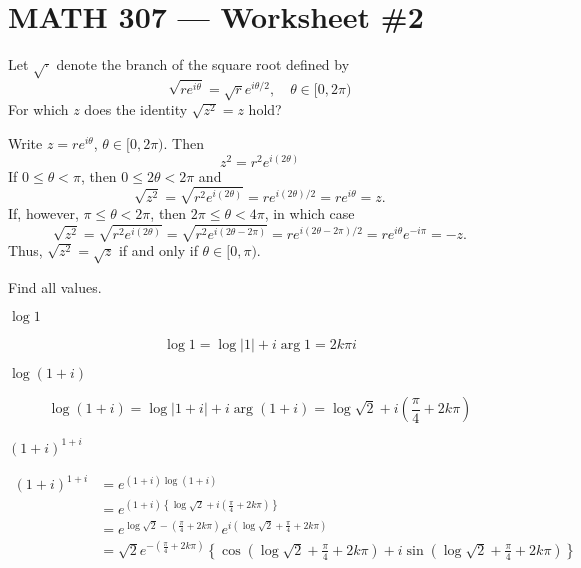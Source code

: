 \documentclass[12pt]{exam}
\begin{document}
\section*{MATH 307 --- Worksheet \#2 }

\begin{questions}
    \setlength\itemsep{1.25em}
    \setlength\parskip{1em}

    \question
    Let $\sqrt{\cdot}$ denote the branch of the square root defined by
    \[
        \sqrt {re^{i\theta}} = \sqrt re^{i\theta/2},\quad \theta\in [0,2\pi)
    \]
    For which $z$ does the identity $\sqrt{z^2}=z$ hold?

    \begin{solution}
        Write $z=re^{i\theta}$, $\theta\in[0,2\pi)$. Then
        \[
            z^2 = r^2e^{i(2\theta)}
        \]
        If $0\leq \theta < \pi$, then $0\leq 2\theta < 2\pi$ and
        \[
            \sqrt {z^2} = \sqrt{r^2e^{i(2\theta)}} = re^{i(2\theta)/2} = re^{i\theta}=z.
        \]
        If, however, $\pi\leq \theta < 2\pi$, then $2\pi\leq \theta < 4\pi$,
        in which case
        \[
            \sqrt {z^2} = \sqrt{r^2e^{i(2\theta)}} = \sqrt{r^2e^{i(2\theta-2\pi)}} =re^{i(2\theta-2\pi)/2} = re^{i\theta}e^{-i\pi}=-z.
        \]
        Thus, $\sqrt{z^2}=\sqrt z$ if and only if $\theta\in [0,\pi)$.
    
    \end{solution}
    \question
    Find all values.
    \begin{parts}
        \item $\log 1$
        \begin{solution}
            \[
                \log 1 = \log |1| + i\arg 1 = 2k\pi i
            \]
        \end{solution}

        \item $\log (1+i)$
        \begin{solution}
            \[
                \log (1+i) = \log |1+i| + i\arg(1+i) = \log\sqrt 2 + i\left(\frac\pi 4 + 2k\pi\right)
            \]
        \end{solution}

        \item $(1+i)^{1+i}$
        \begin{solution}
            \begin{align*}
                (1+i)^{1+i} &= e^{(1+i)\log(1+i)}\\
                &= e^{(1+i)\left\{\log\sqrt 2 + i\left(\frac\pi 4 + 2k\pi\right)\right\}}\\
                &= e^{\log\sqrt2-\left(\frac\pi4+2k\pi\right)}e^{i(\log\sqrt2 + \frac\pi4 + 2k\pi)}\\
                &= \sqrt2e^{-\left(\frac\pi4+2k\pi\right)}
                \left\{\cos\left(\log\sqrt2 + \frac\pi4 + 2k\pi\right) + i\sin\left(\log\sqrt2 + \frac\pi4 + 2k\pi\right)\right\}
            \end{align*}
        \end{solution}
    \end{parts}


\end{questions}
\end{document}
